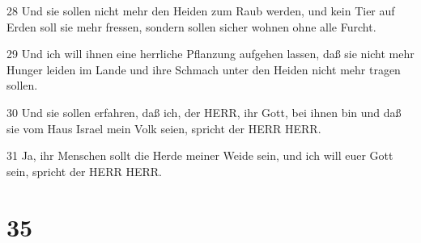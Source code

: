 \par 28 Und sie sollen nicht mehr den Heiden zum Raub werden, und kein Tier auf Erden soll sie mehr fressen, sondern sollen sicher wohnen ohne alle Furcht.
\par 29 Und ich will ihnen eine herrliche Pflanzung aufgehen lassen, daß sie nicht mehr Hunger leiden im Lande und ihre Schmach unter den Heiden nicht mehr tragen sollen.
\par 30 Und sie sollen erfahren, daß ich, der HERR, ihr Gott, bei ihnen bin und daß sie vom Haus Israel mein Volk seien, spricht der HERR HERR.
\par 31 Ja, ihr Menschen sollt die Herde meiner Weide sein, und ich will euer Gott sein, spricht der HERR HERR.

\chapter{35}

